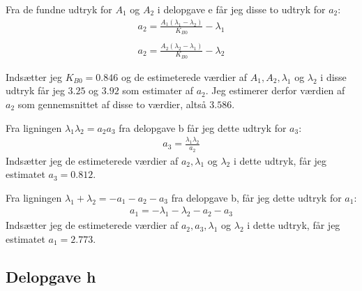 \documentclass[12pt]{article}
\begin{document}
Fra de fundne udtryk for $A_1$ og $A_2$ i delopgave e får jeg disse to udtryk for $a_2$:
\begin{align}
a_2 = \frac{A_1(\lambda_1 - \lambda_2)}{K_{B0}} - \lambda_1 \\ \\
a_2 = \frac{A_2(\lambda_2 - \lambda_1)}{K_{B0}} - \lambda_2
\end{align}

Indsætter jeg $K_{B0}=0.846$ og de estimeterede værdier af $A_1, A_2, \lambda_1$ og $\lambda_2$ i disse udtryk får jeg $3.25$ og $3.92$ som estimater af $a_2$. Jeg estimerer derfor værdien af $a_2$ som gennemsnittet af disse to værdier, altså $3.586$.

Fra ligningen $\lambda_1\lambda_2 = a_2a_3$ fra delopgave b får jeg dette udtryk for $a_3$:
\begin{align}
a_3 = \frac{\lambda_1\lambda_2}{a_2}
\end{align}
Indsætter jeg de estimeterede værdier af $a_2, \lambda_1$ og $\lambda_2$ i dette udtryk, får jeg estimatet $a_3 = 0.812$. 

Fra ligningen $\lambda_1 + \lambda_2 = -a_1 - a_2 - a_3$ fra delopgave b, får jeg dette udtryk for $a_1$:
\begin{align}
a_1 = -\lambda_1 -\lambda_2 -a_2 -a_3
\end{align}
Indsætter jeg de estimeterede værdier af $a_2, a_3, \lambda_1$ og $\lambda_2$ i dette udtryk, får jeg estimatet $a_1 = 2.773$.

\subsection{Delopgave h}
\end{document}

